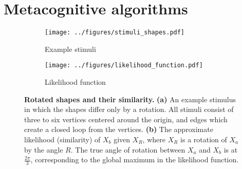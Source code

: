 \documentclass{article} %
\begin{document}
\section{Metacognitive algorithms}

\begin{figure}[t]
  \centering
  \begin{subfigure}[b]{0.45\textwidth}
    \centering
    \texttt{[image: ../figures/stimuli\_shapes.pdf]}
    \vspace{0pt}
    \caption{Example stimuli}
    \label{fig:stimuli}
  \end{subfigure}
  \begin{subfigure}[b]{0.45\textwidth}
    \centering
    \texttt{[image: ../figures/likelihood\_function.pdf]}
    \caption{Likelihood function}
    \label{fig:likelihood}
  \end{subfigure}
  \caption{\textbf{Rotated shapes and their similarity.}  \textbf{(a)}
    An example stimulus in which the shapes differ only by a
    rotation. All stimuli consist of three to six vertices centered
    around the origin, and edges which create a closed loop from the
    vertices. \textbf{(b)} The approximate likelihood (similarity) of
    $X_b$ given $X_R$, where $X_R$ is a rotation of $X_a$ by the angle
    $R$. The true angle of rotation between $X_a$ and $X_b$ is at
    $\frac{2\pi}{3}$, corresponding to the global maximum in the
    likelihood function.}
  \label{fig:shapes}
\end{figure}
\end{document}
